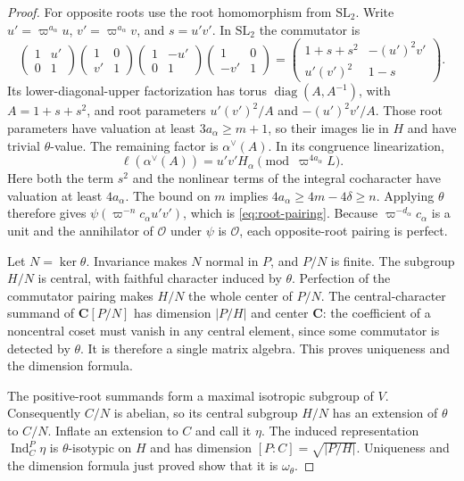 \documentclass[10pt]{amsart}
\newcommand{\Ocal}{\mathcal O}
\newcommand{\C}{\mathbf C}
\begin{document}
\begin{proof}
For opposite roots use the root homomorphism from $\mathrm{SL}_2$.
Write $u'=\varpi^{a_\alpha}u$, $v'=\varpi^{a_\alpha}v$, and $s=u'v'$.
In $\mathrm{SL}_2$ the commutator is
\[
 \begin{pmatrix}1&u'\\0&1\end{pmatrix}
 \begin{pmatrix}1&0\\v'&1\end{pmatrix}
 \begin{pmatrix}1&-u'\\0&1\end{pmatrix}
 \begin{pmatrix}1&0\\-v'&1\end{pmatrix}
 =
 \begin{pmatrix}
  1+s+s^2&-(u')^2v'\\
  u'(v')^2&1-s
 \end{pmatrix}.
\]
Its lower-diagonal-upper factorization has torus
$\operatorname{diag}(A,A^{-1})$, with $A=1+s+s^2$, and root parameters
$u'(v')^2/A$ and $-(u')^2v'/A$. Those root parameters have valuation at least
$3a_\alpha\geq m+1$, so their images lie in $H$ and have trivial $\theta$-value.
The remaining factor is $\alpha^\vee(A)$. In its congruence linearization,
\[
 \ell(\alpha^\vee(A))=u'v'H_\alpha
       \pmod{\varpi^{4a_\alpha}L}.
\]
Here both the term $s^2$ and the nonlinear terms of the integral cocharacter
have valuation at least $4a_\alpha$. The bound on $m$ implies
$4a_\alpha\geq4m-4\delta\geq n$. Applying $\theta$ therefore gives
$\psi(\varpi^{-n}c_\alpha u'v')$, which is \eqref{eq:root-pairing}.
Because $\varpi^{-d_\alpha}c_\alpha$ is a unit and the annihilator of
$\Ocal$ under $\psi$ is $\Ocal$, each opposite-root pairing is perfect.

Let $N=\ker\theta$. Invariance makes $N$ normal in $P$, and $P/N$ is finite.
The subgroup $H/N$ is central, with faithful character induced by $\theta$.
Perfection of the commutator pairing makes $H/N$ the whole center of $P/N$.
The central-character summand of $\C[P/N]$ has dimension $|P/H|$ and center
$\C$: the coefficient of a noncentral coset must vanish in any central element,
since some commutator is detected by $\theta$. It is therefore a single matrix
algebra. This proves uniqueness and the dimension formula.

The positive-root summands form a maximal isotropic subgroup of $V$.
Consequently $C/N$ is abelian, so its central subgroup $H/N$ has an extension
of $\theta$ to $C/N$. Inflate an extension to $C$ and call it $\eta$.
The induced representation $\operatorname{Ind}_C^P\eta$ is
$\theta$-isotypic on $H$ and has dimension $[P:C]=\sqrt{|P/H|}$.
Uniqueness and the dimension formula just proved show that it is
$\omega_\theta$.


\end{proof}
\end{document}

